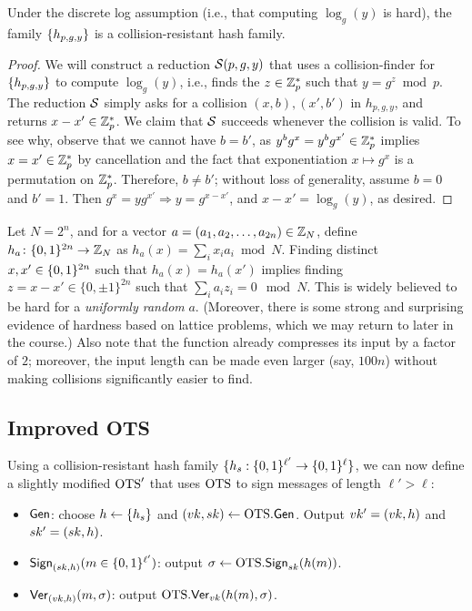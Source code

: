 \documentclass[11pt]{article}
\begin{document}
\begin{claim}
  Under the discrete log assumption (i.e., that computing $\log_{g}(y)$ is hard), the family $\{h_{p,g,y}\}$ is a collision-resistant hash family.
\end{claim}

\begin{proof}
  We will construct a reduction $\mathcal{S}(p,g,y)$ that uses a
  collision-finder for $\{h_{p,g,y}\}$ to compute $\log_{g}(y)$,
  i.e., finds the $z \in \mathbb{Z}_p^{*}$ such that $y = g^z \bmod p$.  The
  reduction $\mathcal{S}$ simply asks for a collision $(x,b), (x',b')$ in
  $h_{p,g,y}$, and returns $x-x' \in \mathbb{Z}_p^{*}$.  We claim that $\mathcal{S}$
  succeeds whenever the collision is valid.  To see why, observe that
  we cannot have $b = b'$, as $y^b g^x = y^{b} g^{x'} \in \mathbb{Z}_p^{*}$
  implies $x = x' \in \mathbb{Z}_p^{*}$ by cancellation and the fact that
  exponentiation $x \mapsto g^{x}$ is a permutation on $\mathbb{Z}_p^{*}$.
  Therefore, $b \neq b'$; without loss of generality, assume $b = 0$
  and $b' = 1$.  Then $g^x = y g^{x'} \Rightarrow y = g^{x - x'}$, and
  $x-x' = \log_{g}(y)$, as desired.
\end{proof}

\begin{example}
  Let $N= 2^{n}$, and for a vector $a=(a_1,a_2,\ldots, a_{2n}) \in
  \mathbb{Z}_N$, define $h_a \colon \{0,1\}^{2n} \to \mathbb{Z}_N$ as $h_a(x) = \sum_i
  x_i a_i \bmod N$.  Finding distinct $x,x' \in \{0,1\}^{2n}$ such that
  $h_{a}(x) = h_{a}(x')$ implies finding $z = x-x' \in \{0, \pm 1
  \}^{2n}$ such that $\sum_i a_i z_i = 0 \mod N$.  This is widely
  believed to be hard for a \emph{uniformly random} $a$.  (Moreover,
  there is some strong and surprising evidence of hardness based on
  lattice problems, which we may return to later in the course.)  Also
  note that the function already compresses its input by a factor of
  $2$; moreover, the input length can be made even larger (say,
  $100n$) without making collisions significantly easier to find.
\end{example}

\subsection{Improved OTS}

Using a collision-resistant hash family $\{h_{s} : \{0,1\}^{\ell'} \to
  \{0,1\}^{\ell}\}$, we can now define a slightly modified $\text{OTS}'$ that
uses $\text{OTS}$ to sign messages of length $\ell' > \ell$:

\begin{itemize}
\item $\mathsf{Gen}$: choose $h \gets \{h_s\}$ and $(vk,sk) \gets
  \text{OTS}.\mathsf{Gen}$.  Output $vk' = (vk, h)$ and $sk' = (sk,h)$.
\item $\mathsf{Sign}_{(sk,h)}(m \in \{0,1\}^{\ell'})$: output $\sigma \gets
  \text{OTS}.\mathsf{Sign}_{sk}(h(m))$.
\item $\mathsf{Ver}_{(vk,h)}(m,\sigma)$: output
  $\text{OTS}.\mathsf{Ver}_{vk}(h(m),\sigma)$.
\end{itemize}
\end{document}
